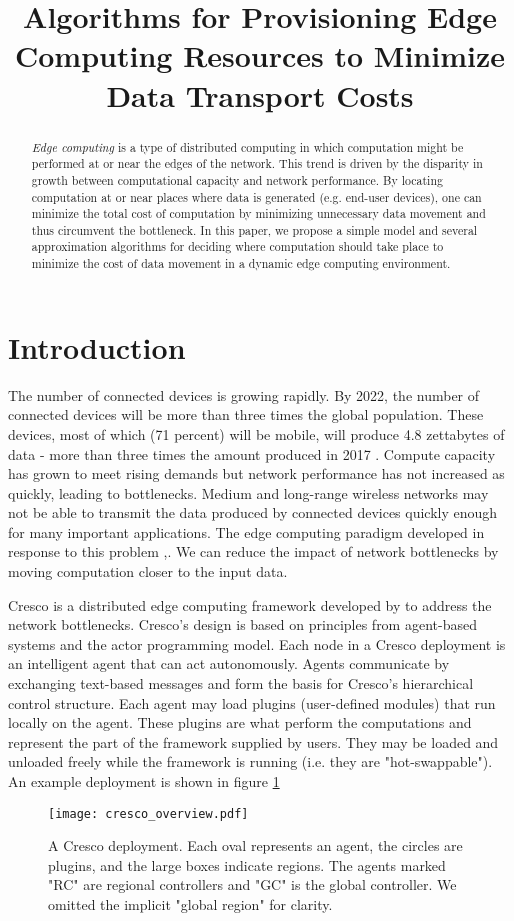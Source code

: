 \documentclass[conference]{IEEEtran}
\author{\IEEEauthorblockN{Author information removed for submission}}
\title{Algorithms for Provisioning Edge Computing Resources to Minimize Data Transport Costs}
\begin{document}
	\maketitle
	\begin{abstract}
    \textit{Edge computing} is a type of distributed computing in which computation might be performed at or near the edges of the network. This trend is driven by the disparity in growth between computational capacity and network performance. By locating computation at or near places where data is generated (e.g. end-user devices), one can minimize the total cost of computation by minimizing unnecessary data movement and thus circumvent the bottleneck. In this paper, we propose a simple model and several approximation algorithms for deciding where computation should take place to minimize the cost of data movement in a dynamic edge computing environment.
	\end{abstract}
	
	\section{Introduction}
	The number of connected devices is growing rapidly. By 2022, the number of connected devices will be more than three times the global population. These devices, most of which (71 percent) will be mobile, will produce 4.8 zettabytes of data - more than three times the amount produced in 2017 \cite{ciscoVNI}. Compute capacity has grown to meet rising demands but network performance has not increased as quickly, leading to bottlenecks. Medium and long-range wireless networks may not be able to transmit the data produced by connected devices quickly enough for many important applications. The edge computing paradigm developed in response to this problem \cite{edgeEmerge},\cite{edgePromise}. We can reduce the impact of network bottlenecks by moving computation closer to the input data.
	
	Cresco is a distributed edge computing framework developed by \cite{bumgardner2016cresco} to address the network bottlenecks. Cresco's design is based on principles from agent-based systems and the actor programming model. Each node in a Cresco deployment is an intelligent agent that can act autonomously. Agents communicate by exchanging text-based messages and form the basis for Cresco's hierarchical control structure. Each agent may load plugins (user-defined modules) that run locally on the agent. These plugins are what perform the computations and represent the part of the framework supplied by users. They may be loaded and unloaded freely while the framework is running (i.e. they are "hot-swappable"). An example deployment is shown in figure \ref{fig:cresco_overview}
	\begin{figure}
	    \centering
	    \texttt{[image: cresco\_overview.pdf]}
	    \caption{A Cresco deployment. Each oval represents an agent, the circles are plugins, and the large boxes indicate regions. The agents marked "RC" are regional controllers and "GC" is the global controller. We omitted the implicit "global region" for clarity.}
	    \label{fig:cresco_overview}
	\end{figure}
\end{document}
